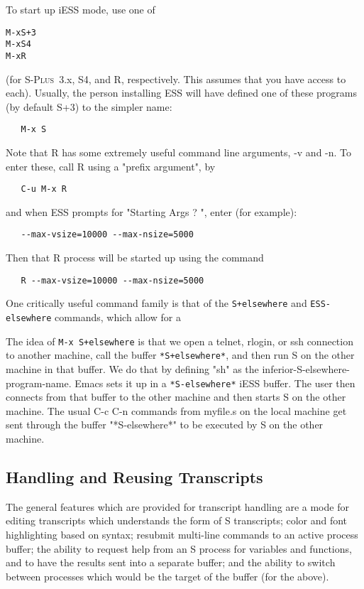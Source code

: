 \documentclass{article}
\newcommand*{\Splus}{\textsc{S-Plus}}
\newenvironment{Salltt}{\small\begin{alltt}}{\end{alltt}}
\begin{document}
To start up iESS mode, use one of
\begin{Salltt}
   M-x S+3 
   M-x S4
   M-x R
\end{Salltt}
(for \Splus~3.x, S4, and R, respectively.  This assumes that you have
access to each).  Usually, the person installing ESS will have defined
one of these programs (by default S+3) to the simpler name:
\begin{verbatim}
   M-x S
\end{verbatim}
Note that R has some extremely useful command line arguments, 
-v and -n.   To enter these, call R using a "prefix argument", by
\begin{verbatim}
   C-u M-x R
\end{verbatim}
and when ESS prompts for "Starting Args ? ", enter (for example):
\begin{verbatim}
   --max-vsize=10000 --max-nsize=5000
\end{verbatim}
Then that R process will be started up using the command
\begin{verbatim}
   R --max-vsize=10000 --max-nsize=5000
\end{verbatim}

One critically useful command family is that of the \verb|S+elsewhere|
and \verb|ESS-elsewhere| commands, which allow for a 

The idea of \verb|M-x S+elsewhere| is that we open a telnet, rlogin,
or ssh connection to another machine, call the buffer
\verb|*S+elsewhere*|, and then run S on the other machine in that
buffer.  We do that by defining "sh" as the
inferior-S-elsewhere-program-name.  Emacs sets it up in a
\verb|*S-elsewhere*| iESS buffer.  The user then connects from that
buffer to the other machine and then starts S on the other machine.
The usual C-c C-n commands from myfile.s on the local machine get sent
through the buffer "*S-elsewhere*" to be executed by S on the other
machine.

\subsection{Handling and Reusing Transcripts}
\label{sec:S:trans}

The general features which are provided for transcript handling are a
mode for editing transcripts which understands the form of S
transcripts; color and font highlighting based on syntax; resubmit
multi-line commands to an active process buffer; the ability to
request help from an S process for variables and functions, and to
have the results sent into a separate buffer; and the ability to
switch between processes which would be the target of the buffer (for
the above).
\end{document}
